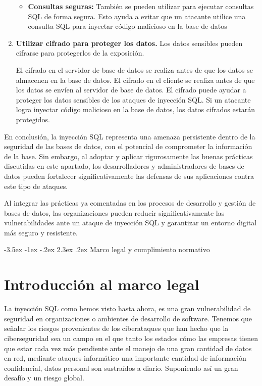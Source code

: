 \documentclass[11pt]{report}
\makeatletter
\renewcommand\chapter{\@startsection{chapter}{0}{\z@}%
    {-3.5ex \@plus -1ex \@minus -.2ex}%
    {2.3ex \@plus.2ex}%
    {\normalfont\Large\bfseries}}
\makeatother
\begin{document}
\begin{enumerate}
\begin{itemize}
    \item \textbf{Consultas seguras:} También se pueden utilizar para ejecutar consultas SQL de forma segura. Esto ayuda a evitar que un atacante utilice una consulta SQL para inyectar código malicioso en la base de datos
  \end{itemize}

  \item \textbf{Utilizar cifrado para proteger los datos.} Los datos sensibles pueden cifrarse para protegerlos de la exposición.

  El cifrado en el servidor de base de datos se realiza antes de que los datos se almacenen en la base de datos. El cifrado en el cliente se
  realiza antes de que los datos se envíen al servidor de base de datos. El cifrado puede ayudar a proteger los datos sensibles de los ataques
  de inyección SQL. Si un atacante logra inyectar código malicioso en la base de datos, los datos cifrados estarán protegidos.
\end{enumerate}

En conclusión, la inyección SQL representa una amenaza persistente dentro de la seguridad de las bases de datos, con el potencial de comprometer la información de la base. Sin embargo, al adoptar y aplicar rigurosamente las buenas prácticas discutidas en este apartado, los desarrolladores y administradores de bases de datos pueden fortalecer significativamente las defensas de sus aplicaciones contra este tipo de ataques.

Al integrar las prácticas ya comentadas en los procesos de desarrollo y gestión de bases de datos, las organizaciones pueden reducir significativamente las vulnerabilidades ante un ataque de inyección SQL y garantizar un entorno digital más seguro y resistente.

\cleardoublepage

\chapter{Marco legal y cumplimiento normativo}
\section{Introducción al marco legal}
La inyección SQL como hemos visto hasta ahora, es una gran vulnerabilidad de seguridad en organizaciones o ambientes de desarrollo de software. 
Tenemos que señalar los riesgos provenientes de los ciberataques que han hecho que  la ciberseguridad sea un campo en el que tanto los estados 
cómo las empresas tienen que estar cada vez más pendiente ante el manejo de una gran cantidad de datos en red, mediante ataques informático una
importante cantidad de información confidencial, datos personal son sustraídos a diario. Suponiendo así un gran desafío y un riesgo global.
\end{document}
